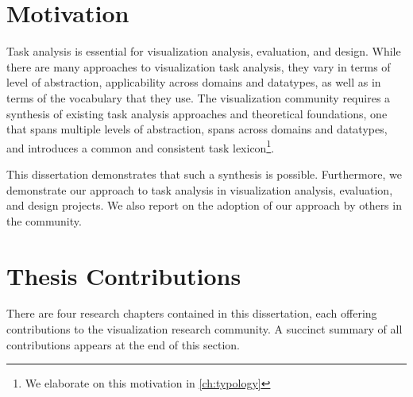 
\section{Motivation}
\label{intro:motivation}


Task analysis is essential for visualization analysis, evaluation, and design.
While there are many approaches to visualization task analysis, they vary in terms of level of abstraction, applicability across domains and datatypes, as well as in terms of the vocabulary that they use. 
The visualization community requires a synthesis of existing task analysis approaches and theoretical foundations, one that spans multiple levels of abstraction, spans across domains and datatypes, and introduces a common and consistent task lexicon\footnote{We elaborate on this motivation in \autoref{ch:typology}}.

This dissertation demonstrates that such a synthesis is possible. 
Furthermore, we demonstrate our approach to task analysis in visualization analysis, evaluation, and design projects.
We also report on the adoption of our approach by others in the community.


\section{Thesis Contributions}
\label{intro:research-program}


There are four research chapters contained in this dissertation, each offering contributions to the visualization research community.
A succinct summary of all contributions appears at the end of this section.

